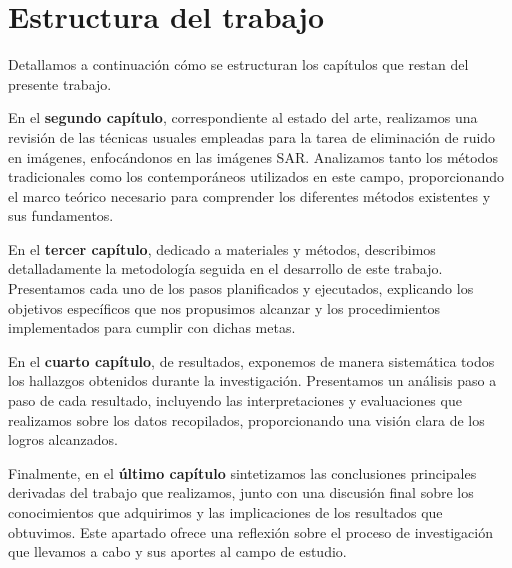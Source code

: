 \section{Estructura del trabajo}

Detallamos a continuación cómo se estructuran los capítulos que restan del presente trabajo.

En el \textbf{segundo capítulo}, correspondiente al estado del arte, realizamos una revisión de las técnicas usuales empleadas para la tarea de eliminación de ruido en imágenes, enfocándonos en las imágenes SAR. Analizamos tanto los métodos tradicionales como los contemporáneos utilizados en este campo, proporcionando el marco teórico necesario para comprender los diferentes métodos existentes y sus fundamentos.

En el \textbf{tercer capítulo}, dedicado a materiales y métodos, describimos detalladamente la metodología seguida en el desarrollo de este trabajo. Presentamos cada uno de los pasos planificados y ejecutados, explicando los objetivos específicos que nos propusimos alcanzar y los procedimientos implementados para cumplir con dichas metas.

En el \textbf{cuarto capítulo}, de resultados, exponemos de manera sistemática todos los hallazgos obtenidos durante la investigación. Presentamos un análisis paso a paso de cada resultado, incluyendo las interpretaciones y evaluaciones que realizamos sobre los datos recopilados, proporcionando una visión clara de los logros alcanzados.

Finalmente, en el \textbf{último capítulo} sintetizamos las conclusiones principales derivadas del trabajo que realizamos, junto con una discusión final sobre los conocimientos que adquirimos y las implicaciones de los resultados que obtuvimos. Este apartado ofrece una reflexión sobre el proceso de investigación que llevamos a cabo y sus aportes al campo de estudio.
